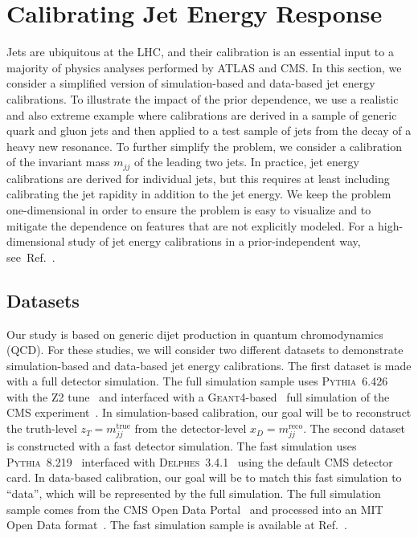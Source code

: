 \documentclass[aps,prd,reprint,preprintnumbers,superscriptaddress,nofootinbib,longbibliography,floatfix]{revtex4-1}
\DeclareRobustCommand{\Ref}[1]{Ref.~\cite{#1}}
\begin{document}
\section{Calibrating Jet Energy Response}
\label{sec:hep}

Jets are ubiquitous at the LHC, and their calibration is an essential input to a majority of physics analyses performed by ATLAS and CMS.
%
In this section, we consider a simplified version of simulation-based and data-based jet energy calibrations.
%
To illustrate the impact of the prior dependence, we use a realistic and also extreme example where calibrations are derived in a sample of generic quark and gluon jets and then applied to a test sample of jets from the decay of a heavy new resonance.
%
To further simplify the problem, we consider a calibration of the invariant mass $m_{jj}$ of the leading two jets.
%
In practice, jet energy calibrations are derived for individual jets, but this requires at least including calibrating the jet rapidity in addition to the jet energy.
%
We keep the problem one-dimensional in order to ensure the problem is easy to visualize and to mitigate the dependence on features that are not explicitly modeled.
%
For a high-dimensional study of jet energy calibrations in a prior-independent way, see~\Ref{frequentstway}.


\subsection{Datasets}


Our study is based on generic dijet production in quantum chromodynamics (QCD).
%
For these studies, we will consider two different datasets to demonstrate simulation-based and data-based jet energy calibrations.
%
The first dataset is made with a full detector simulation. 
%
The full simulation sample uses \textsc{Pythia}~6.426~\cite{Sjostrand:2006za} with the Z2 tune~\cite{Chatrchyan:2011id} and interfaced with a \textsc{Geant4}-based~\cite{Agostinelli:2002hh,1610988,Allison:2016lfl} full simulation of the CMS experiment~\cite{Chatrchyan:2008aa}.
%
In simulation-based calibration, our goal will be to reconstruct the truth-level $z_T = m^{\text{true}}_{jj}$ from the detector-level $x_D = m^{\text{reco}}_{jj}$.
%
The second dataset is constructed with a fast detector simulation.
%
The fast simulation uses \textsc{Pythia}~8.219~\cite{Sjostrand:2007gs} interfaced with \textsc{Delphes}~3.4.1~\cite{deFavereau:2013fsa,Mertens:2015kba,Selvaggi:2014mya} using the default CMS detector card.
%
In data-based calibration, our goal will be to match this fast simulation to ``data'', which will be represented by the full simulation.
%
The full simulation sample comes from the CMS Open Data Portal~\cite{CMS:QCDsim1000-1400,CMS:QCDsim1400-1800,CMS:QCDsim1800} and processed into an MIT Open Data format~\cite{Komiske:2019jim,komiske_patrick_2019_3341502,komiske_patrick_2019_3341770,komiske_patrick_2019_3341772}.
%
The fast simulation sample is available at \Ref{2107.08979,nachman_benjamin_2021_5108967}.
\end{document}
